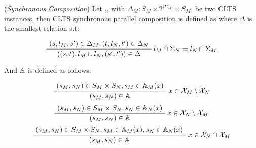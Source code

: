 
\begin{definition} 
	\label{def:synchronous_composition}(\emph{Synchronous Composition}) Let ,, with $\Delta_M : S_M \times 2^{|\Sigma_M|} \times S_M$, be two CLTS instances, then CLTS synchronous parallel composition is defined as  where $\Delta$ is the smallest relation s.t:
	\begin{center}
		\begin{equation}
		\AxiomC{$(s, l_M, s') \in \Delta_M,(t, l_N, t') \in \Delta_N  $}\RightLabel{$l_M \cap \Sigma_N = l_N \cap \Sigma_M$}
		\UnaryInfC{$((s,t),l_M \cup l_N,(s',t')) \in \Delta$}
		\DisplayProof	
		\end{equation}	
	\end{center}
	And $\mathbb{A}$ is defined as follows:
	\begin{center}
		\begin{equation}
		\AxiomC{$(s_M,s_N) \in  S_M \times S_N, s_M \in \acceptors_M(\acceptingSymbol)$}\RightLabel{$\acceptingSymbol \in \acceptingSymbols_M \setminus \acceptingSymbols_N$}
		\UnaryInfC{$(s_M,s_N) \in \acceptors$}
		\DisplayProof	
		\end{equation}			
		\begin{equation}
		\AxiomC{$(s_M,s_N) \in  S_M \times S_N, s_N \in \acceptors_N(\acceptingSymbol)$}\RightLabel{$\acceptingSymbol \in \acceptingSymbols_N \setminus \acceptingSymbols_M$}
		\UnaryInfC{$(s_M,s_N) \in \acceptors$}
		\DisplayProof	
		\end{equation}					
		\begin{equation}
		\AxiomC{$(s_M,s_N) \in  S_M \times S_N, s_M \in \acceptors_M(\acceptingSymbol), s_N \in \acceptors_N(\acceptingSymbol)$}\RightLabel{$\acceptingSymbol \in \acceptingSymbols_N \cap \acceptingSymbols_M$}
		\UnaryInfC{$(s_M,s_N) \in \acceptors$}
		\DisplayProof	
		\end{equation}						
	\end{center}	
\end{definition}